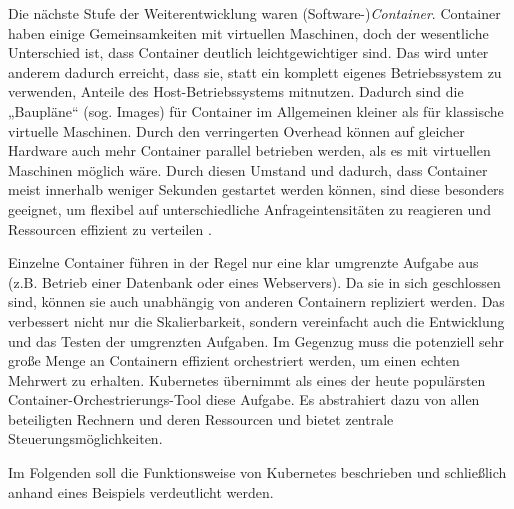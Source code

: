 \documentclass[11pt,a4paper]{article}
\begin{document}
Die nächste Stufe der Weiterentwicklung waren (Software-)\emph{Container}. Container haben einige Gemeinsamkeiten mit virtuellen Maschinen, doch der wesentliche Unterschied ist,
dass Container deutlich leichtgewichtiger sind. Das wird unter anderem dadurch erreicht, dass sie, statt ein komplett eigenes Betriebssystem zu verwenden,
Anteile des Host-Betriebssystems mitnutzen. Dadurch sind die „Baupläne“ (sog. Images) für Container im Allgemeinen kleiner als für klassische virtuelle Maschinen.
Durch den verringerten Overhead können auf gleicher Hardware auch mehr Container parallel betrieben werden, als es mit virtuellen Maschinen möglich wäre.
Durch diesen Umstand und dadurch, dass Container meist innerhalb weniger Sekunden gestartet werden können, sind diese besonders geeignet,
um flexibel auf unterschiedliche Anfrageintensitäten zu reagieren und Ressourcen effizient zu verteilen \cite{kofler2021docker}.

Einzelne Container führen in der Regel nur eine klar umgrenzte Aufgabe aus (z.B. Betrieb einer Datenbank oder eines Webservers). Da sie in sich geschlossen sind,
können sie auch unabhängig von anderen Containern repliziert werden. Das verbessert nicht nur die Skalierbarkeit, sondern
vereinfacht auch die Entwicklung und das Testen der umgrenzten Aufgaben.
Im Gegenzug muss die potenziell sehr große Menge an Containern effizient orchestriert werden, um einen echten Mehrwert zu erhalten.
Kubernetes übernimmt als eines der heute populärsten Container-Orchestrierungs-Tool diese Aufgabe.
Es abstrahiert dazu von allen beteiligten Rechnern und deren Ressourcen und bietet zentrale Steuerungsmöglichkeiten.
\cite{Pagani_2019}



Im Folgenden soll die Funktionsweise von Kubernetes beschrieben und schließlich anhand eines Beispiels
verdeutlicht werden.
\end{document}
